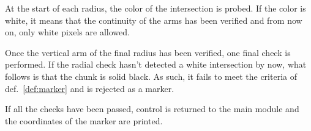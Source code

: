 \documentclass{article}
\begin{document}
	At the start of each radius, the color of the intersection is probed. If the
	color is white, it means that the continuity of the arms has been verified
	and from now on, only white pixels are allowed.
	
	Once the vertical arm of the final radius has been verified, one final check
	is performed. If the radial check hasn't detected a white intersection by
	now, what follows is that the chunk is solid black. As such, it fails to
	meet the criteria of def.~\ref{def:marker} and is rejected as a marker.
	
	If all the checks have been passed, control is returned to the main module
	and the coordinates of the marker are printed.
	
\end{document}

